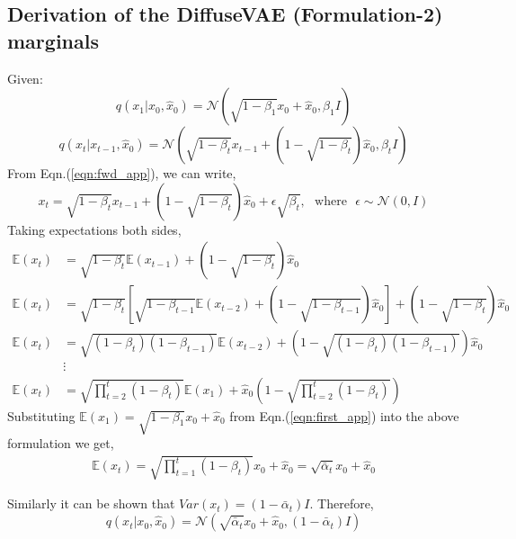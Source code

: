 \documentclass[10pt]{article} \usepackage[accepted]{tmlr}
\begin{document}
\subsection{Derivation of the DiffuseVAE (Formulation-2) marginals}
\label{subsec:appendix_c_2}
\noindent Given:
\begin{equation}
    q(x_1|x_0, \hat{x}_0) = \mathcal{N}(\sqrt{1 - \beta_1}x_0 + \hat{x}_0, \beta_1I)
    \label{eqn:first_app}
\end{equation}
\begin{equation}
    q(x_t|x_{t-1}, \hat{x}_0) = \mathcal{N}(\sqrt{1 - \beta_t} x_{t-1} + (1 - \sqrt{1 - \beta_t})\hat{x}_0, \beta_t I)
    \label{eqn:fwd_app}
\end{equation}
From Eqn.(\ref{eqn:fwd_app}), we can write,
\begin{equation}
    x_t = \sqrt{1 - \beta_t} x_{t-1} + (1 - \sqrt{1 - \beta_t})\hat{x}_0 + \epsilon\sqrt{\beta_t}, \:\:\: \text{where} \:\:\: \epsilon \sim \mathcal{N}(0, I)
\end{equation}
Taking expectations both sides,
\begin{align}
    \mathbb{E}(x_t) &= \sqrt{1 - \beta_t} \mathbb{E}(x_{t-1}) + (1 - \sqrt{1 - \beta_t})\hat{x}_0 \\
    \mathbb{E}(x_t)&= \sqrt{1 - \beta_t} \left[\sqrt{1 - \beta_{t-1}} \mathbb{E}(x_{t-2}) + (1 - \sqrt{1 - \beta_{t-1}})\hat{x}_0\right] \nonumber + (1 - \sqrt{1 - \beta_t})\hat{x}_0 \\
    \mathbb{E}(x_t)&= \sqrt{(1 - \beta_t)(1 - \beta_{t-1})} \mathbb{E}(x_{t-2})\nonumber + \left(1 - \sqrt{(1 - \beta_t)(1 - \beta_{t-1})}\right)\hat{x}_0 \\
    &\vdots \\ 
    \mathbb{E}(x_t) &= \sqrt{\prod_{t=2}^t (1 - \beta_t)} \mathbb{E}(x_1) + \hat{x}_0\left(1 - \sqrt{\prod_{t=2}^t (1 - \beta_t)}\right)
\end{align}
Substituting $\mathbb{E}(x_1) = \sqrt{1 - \beta_1}x_0 + \hat{x}_0$ from Eqn.(\ref{eqn:first_app}) into the above formulation we get,
\begin{align}
    \mathbb{E}(x_t) = \sqrt{\prod_{t=1}^t (1 - \beta_t)}x_0 + \hat{x}_0 = \sqrt{\bar{\alpha}_t}x_0 + \hat{x}_0
\end{align}

\noindent Similarly it can be shown that $Var(x_t) = (1 - \bar{\alpha}_t)I$. Therefore,
\begin{equation}
    q(x_t|x_0, \hat{x}_0) = \mathcal{N}(\sqrt{\bar{\alpha}_t} x_0 + \hat{x}_0, (1-\bar{\alpha}_t)I)
\end{equation}
\newpage
\end{document}
